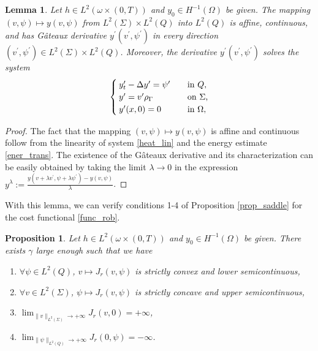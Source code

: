 \documentclass[preprint,10pt]{article}
\newtheorem{lemma}[theorem]{Lemma}
\newtheorem{proposition}[theorem]{Proposition}
\numberwithin{equation}{section}
\numberwithin{theorem}{section}
\def\csbd{\rho_{\Gamma}}
\begin{document}
{\begin{lemma}\label{lemma_prop_sol1}
Let $h\in L^2(\omega\times(0,T))$ and $y_0\in H^{-1}(\Omega)$ be given. The mapping $(v,\psi)\mapsto y(v,\psi)$ from $L^2(\Sigma)\times L^2(Q)$ into $L^2(Q)$ is affine, continuous, and has G\^{a}teaux derivative $y^\prime(v^\prime,\psi^\prime)$ in every direction $(v^\prime,\psi^\prime)\in L^2(\Sigma)\times L^2(Q)$. Moreover, the derivative $y^\prime(v^\prime,\psi^\prime)$ solves the system
%
\begin{equation}\label{deriv_sys1}
\begin{cases}
y^\prime_t-\Delta y^\prime=\psi^\prime \quad &\textnormal{in $Q$}, \\
y^\prime=v^\prime\csbd \quad &\textnormal{on $\Sigma$,} \\
y^\prime(x,0)=0 \quad &\textnormal{in $\Omega$},
\end{cases}
\end{equation}
%
\end{lemma}

\begin{proof}
The fact that the mapping $(v,\psi)\mapsto y(v,\psi)$ is affine and continuous follow from the linearity of system \eqref{heat_lin} and the energy estimate \eqref{ener_trans}. The existence of the G\^{a}teaux derivative and its characterization can be easily obtained by taking the limit $\lambda\to 0$ in the expression $y^\lambda:=\frac{y(v+\lambda v^\prime,\psi+\lambda\psi^\prime)-y(v,\psi)}{\lambda}$.
%
\end{proof}

With this lemma, we can verify conditions 1-4 of Proposition \ref{prop_saddle} for the cost functional \eqref{func_rob}.
%
\begin{proposition}\label{verif_cond}
Let $h\in L^2(\omega\times(0,T))$ and $y_0\in H^{-1}(\Omega)$ be given. There exists $\gamma$ large enough such that we have 
%
\begin{enumerate}
\item $\forall \psi\in L^2(Q)$, $v\mapsto J_r(v,\psi)$ is strictly convex and lower semicontinuous,
\item $\forall v\in L^2(\Sigma)$, $\psi\mapsto J_r(v,\psi)$ is strictly concave and upper semicontinuous,
\item $\lim_{\|v\|_{L^2(\Sigma)}\to+\infty}J_r(v,0)=+\infty$, 
\item $\lim_{\|\psi\|_{L^2(Q)}\to+\infty}J_r(0,\psi)=-\infty$.
\end{enumerate}
%
\end{proposition}
%

}
\end{document}
